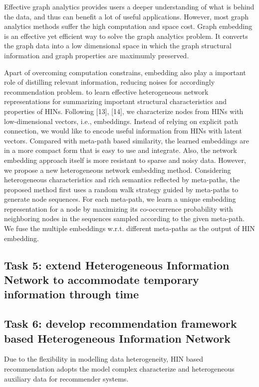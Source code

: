 \documentclass[12pt,a4 paper,title page]{article}
\begin{document}
Effective graph analytics provides users a deeper understanding of what is behind the data, and thus can benefit a lot of useful applications. However, most graph analytics methods suffer the high computation and space cost. Graph embedding is an effective yet efficient way to solve the graph analytics problem. It converts the graph data into a low dimensional space in which the graph structural information and graph properties are maximumly preserved.

Apart of overcoming computation constrains, embedding also play a important role of distilling relevant information, reducing noises for accordingly recommendation problem.
to learn effective heterogeneous network representations for summarizing important structural characteristics and properties of HINs. Following [13], [14], we characterize nodes from HINs with low-dimensional vectors, i.e., embeddings. Instead of relying on explicit path connection, we would like to encode useful information from HINs with latent vectors. Compared with meta-path based similarity, the learned embeddings are in a more compact form that is easy to use and integrate. Also, the network embedding approach itself is more resistant to sparse and noisy data. However, we propose a new heterogeneous network embedding method. Considering heterogeneous characteristics and rich semantics reflected by meta-paths, the proposed method first uses a random walk strategy guided by meta-paths to generate node sequences. For each meta-path, we learn a unique embedding representation for a node by maximizing its co-occurrence probability with neighboring nodes in the sequences sampled according to the given meta-path. We fuse the multiple embeddings w.r.t. different meta-paths as the output of HIN embedding.




\subsection{Task 5: extend Heterogeneous Information Network to accommodate temporary information through time}
 

\subsection{Task 6: develop recommendation framework based Heterogeneous Information Network}

Due to the flexibility in modelling data heterogeneity, HIN based recommendation adopts the model complex characterize and heterogeneous auxiliary data for recommender systems.
\end{document}
